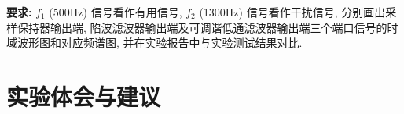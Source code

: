 \documentclass{dspreport}
\begin{document}
\textbf{要求:} $f_1$ (500Hz) 信号看作有用信号, $f_2$ (1300Hz) 信号看作干扰信号, 分别画出采样保持器输出端, 陷波滤波器输出端及可调谐低通滤波器输出端三个端口信号的时域波形图和对应频谱图, 并在实验报告中与实验测试结果对比.
\begin{block}

\end{block}

\begin{figure}[H]
    \centering
\end{figure}

\begin{block}

\end{block}

\section{实验体会与建议}
\begin{block}

\end{block}
\end{document}
